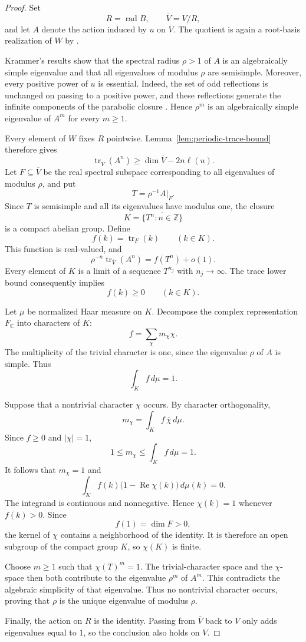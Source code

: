 \documentclass[11pt,reqno]{amsart}
\theoremstyle{plain}
\theoremstyle{definition}
\theoremstyle{remark}
\numberwithin{equation}{section}
\begin{document}
\begin{proof}
Set
\[
R=\operatorname{rad}B,
\qquad
\overline V=V/R,
\]
and let $A$ denote the action induced by $u$ on $\overline V$.
The quotient is again a root-basis realization of $W$
by \cite[Proposition~6.1.3]{Krammer2009}.

Krammer's results
\cite[Lemma~6.5.4 and Theorem~6.5.14]{Krammer2009}
show that the spectral radius $\rho>1$ of $A$ is an
algebraically simple eigenvalue and that all eigenvalues
of modulus $\rho$ are semisimple.
Moreover, every positive power of $u$ is essential.
Indeed, the set of odd reflections is unchanged on passing
to a positive power, and these reflections generate the
infinite components of the parabolic closure
\cite[Lemma~5.2.7 and Corollary~5.8.7]{Krammer2009}.
Hence $\rho^m$ is an algebraically simple eigenvalue of $A^m$
for every $m\geq1$.

Every element of $W$ fixes $R$ pointwise.
Lemma~\ref{lem:periodic-trace-bound} therefore gives
\[
\operatorname{tr}_{\overline V}(A^n)
\geq\dim\overline V-2n\ell(u).
\]
Let $F\subseteq\overline V$ be the real spectral subspace
corresponding to all eigenvalues of modulus $\rho$, and put
\[
T=\rho^{-1}A|_F.
\]
Since $T$ is semisimple and all its eigenvalues have modulus
one, the closure
\[
K=\overline{\{T^n:n\in\mathbb Z\}}
\]
is a compact abelian group.
Define
\[
f(k)=\operatorname{tr}_F(k)
\qquad(k\in K).
\]
This function is real-valued, and
\[
\rho^{-n}\operatorname{tr}_{\overline V}(A^n)
=
f(T^n)+o(1).
\]
Every element of $K$ is a limit of a sequence $T^{n_j}$ with
$n_j\to\infty$.
The trace lower bound consequently implies
\[
f(k)\geq0
\qquad(k\in K).
\]

Let $\mu$ be normalized Haar measure on $K$.
Decompose the complex representation $F_{\mathbb C}$ into
characters of $K$:
\[
f=\sum_{\chi}m_\chi\chi.
\]
The multiplicity of the trivial character is one, since
the eigenvalue $\rho$ of $A$ is simple.
Thus
\[
\int_K f\,d\mu=1.
\]

Suppose that a nontrivial character $\chi$ occurs.
By character orthogonality,
\[
m_\chi=\int_K f\,\overline{\chi}\,d\mu.
\]
Since $f\geq0$ and $|\chi|=1$,
\[
1\leq m_\chi
\leq\int_K f\,d\mu=1.
\]
It follows that $m_\chi=1$ and
\[
\int_K f(k)\bigl(1-\operatorname{Re}\chi(k)\bigr)\,d\mu(k)=0.
\]
The integrand is continuous and nonnegative.
Hence $\chi(k)=1$ whenever $f(k)>0$.
Since
\[
f(1)=\dim F>0,
\]
the kernel of $\chi$ contains a neighborhood of the identity.
It is therefore an open subgroup of the compact group $K$,
so $\chi(K)$ is finite.

Choose $m\geq1$ such that $\chi(T)^m=1$.
The trivial-character space and the $\chi$-space then both
contribute to the eigenvalue $\rho^m$ of $A^m$.
This contradicts the algebraic simplicity of that eigenvalue.
Thus no nontrivial character occurs, proving that $\rho$ is
the unique eigenvalue of modulus $\rho$.

Finally, the action on $R$ is the identity.
Passing from $\overline V$ back to $V$ only adds eigenvalues
equal to $1$, so the conclusion also holds on $V$.
\end{proof}
\end{document}
